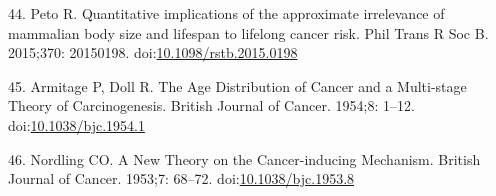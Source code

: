\documentclass[]{elsarticle} %
\begin{document}
\leavevmode\hypertarget{ref-Peto:20151c2}{}%
44. Peto R. Quantitative implications of the approximate irrelevance of
mammalian body size and lifespan to lifelong cancer risk. Phil Trans R
Soc B. 2015;370: 20150198.
doi:\href{https://doi.org/10.1098/rstb.2015.0198}{10.1098/rstb.2015.0198}

\leavevmode\hypertarget{ref-ArmitageAndDoll1954}{}%
45. Armitage P, Doll R. The Age Distribution of Cancer and a Multi-stage
Theory of Carcinogenesis. British Journal of Cancer. 1954;8: 1--12.
doi:\href{https://doi.org/10.1038/bjc.1954.1}{10.1038/bjc.1954.1}

\leavevmode\hypertarget{ref-Nordling1953}{}%
46. Nordling CO. A New Theory on the Cancer-inducing Mechanism. British
Journal of Cancer. 1953;7: 68--72.
doi:\href{https://doi.org/10.1038/bjc.1953.8}{10.1038/bjc.1953.8}
\end{document}
